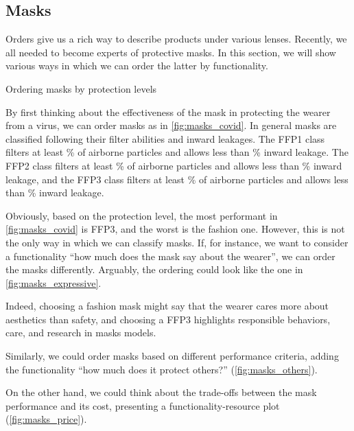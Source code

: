 \vfill\clearpage
\subsection{Masks}

Orders give us a rich way to describe products under various lenses.
Recently, we all needed to become experts of protective masks.
In this section, we will show various ways in which we can order the latter by functionality.

\begin{marginfigure}
    \centering
    \caption{Ordering masks by protection levels}
    \label{fig:masks_covid}
\end{marginfigure}
By first thinking about the effectiveness of the mask in protecting the wearer from a virus, we can order masks as in \cref{fig:masks_covid}.
In general masks are classified following their filter abilities and inward leakages.
The FFP1 class filters at least \unit[80]{\%} of airborne particles and allows less than \unit[22]{\%} inward leakage.
The FFP2 class filters at least \unit[96]{\%} of airborne particles and allows less than \unit[8]{\%} inward leakage, and the FFP3 class filters at least \unit[99]{\%} of airborne particles and allows less than \unit[2]{\%} inward leakage.

Obviously, based on the protection level, the most performant in \cref{fig:masks_covid} is FFP3, and the worst is the fashion one.
However, this is not the only way in which we can classify masks.
If, for instance, we want to consider a functionality ``how much does the mask say about the wearer'', we can order the masks differently.
Arguably, the ordering could look like the one in \cref{fig:masks_expressive}.

Indeed, choosing a fashion mask might say that the wearer cares more about aesthetics than safety, and choosing a FFP3 highlights responsible behaviors, care, and research in masks models.

Similarly, we could order masks based on different performance criteria, adding the functionality ``how much does it protect others?'' (\cref{fig:masks_others}).


On the other hand, we could think about the trade-offs between the mask performance and its cost, presenting a functionality-resource plot (\cref{fig:masks_price}).


